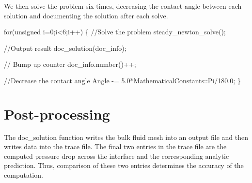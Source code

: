 

We then solve the problem six times, decreasing the contact angle between each solution and documenting the solution after each solve.


\begin{DoxyCodeInclude}
 \textcolor{keywordflow}{for}(\textcolor{keywordtype}{unsigned} i=0;i<6;i++)
  \{
   \textcolor{comment}{//Solve the problem}
   steady\_newton\_solve();

   \textcolor{comment}{//Output result}
   doc\_solution(doc\_info);

   \textcolor{comment}{// Bump up counter}
   doc\_info.number()++;

   \textcolor{comment}{//Decrease the contact angle}
   Angle -= 5.0*MathematicalConstants::Pi/180.0;
  \}

\end{DoxyCodeInclude}
\hypertarget{index_doc}{}\section{Post-\/processing}\label{index_doc}
The {\ttfamily doc\+\_\+solution} function writes the bulk fluid mesh into an output file and then writes data into the trace file. The final two entries in the trace file are the computed pressure drop across the interface and the corresponding analytic prediction. Thus, comparison of these two entries determines the accuracy of the computation.


